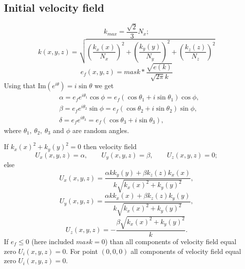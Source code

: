 \documentclass[letterpaper,12pt,fleqn]{article}
\newcommand*\I[1]{\text{Im}(#1)}
\begin{document}
\subsection{Initial velocity field}
\begin{equation}
k_{max} = \frac{\sqrt{2}}{3}N_x;
\end{equation}
\begin{equation}
k(x,y,z) =\sqrt{ \left(\frac{k_x(x)}{N_x}\right)^2 + \left(\frac{k_y(y)}{N_y}\right)^2 + \left(\frac{k_z(z)}{N_z}\right)^2}
\end{equation}
\begin{equation}
e_f(x,y,z) = mask*\frac{\sqrt{e(k)}}{\sqrt{2\pi}k}
\end{equation}
Using that $\I{e^{i \theta}} = i\sin \theta$ we get
\begin{align}
	&\alpha =  e_fe^{i\theta_1}\cos\phi = e_f(\cos\theta_1 + i \sin\theta_1)\cos\phi,\\	
	&\beta  = e_fe^{i\theta_2}\sin\phi = e_f(\cos\theta_2 + i \sin\theta_2)\sin\phi,\\
	&\delta = e_fe^{i\theta_3} = e_f(\cos\theta_3 + i \sin\theta_3),
\end{align}
where $\theta_1,\ \theta_2,\ \theta_3$ and $\phi$ are random angles.

If $k_x(x)^2+k_y(y)^2=0$ then velocity field 
\begin{equation}
	U_x(x,y,z) = \alpha,\qquad    
	U_y(x,y,z) = \beta,\qquad
	U_z(x,y,z) = 0;  
\end{equation}
else 
\begin{equation}
U_x(x,y,z) = \frac{\alpha kk_y(y) + \beta k_z(z)k_x(x)}{k\sqrt{k_x(x)^2 + k_y(y)^2}},
\end{equation}
\begin{equation}
U_y(x,y,z) = \frac{\alpha kk_x(x)+\beta k_z(z)k_y(y)}{k\sqrt{k_x(x)^2 + k_y(y)^2}},
\end{equation}
\begin{equation}
U_z(x,y,z) = -\frac{\beta\sqrt{k_x(x)^2+k_y(y)^2}}{k}.  
\end{equation}
If $e_f\le 0$ (here included $mask =0$) than all components of velocity field equal zero $U_i(x,y,z)=0$.
For point $(0,0,0)$ all components of velocity field equal zero $U_i(x,y,z)=0$. 
\end{document}
